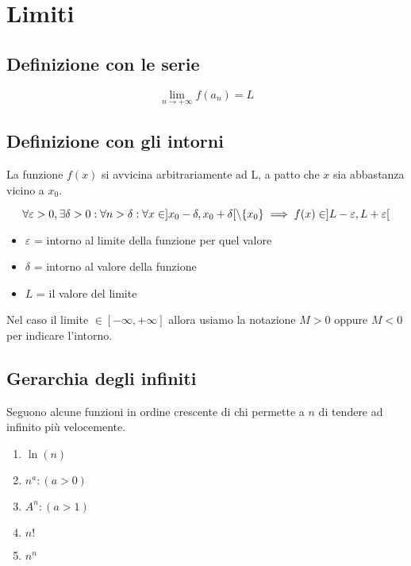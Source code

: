 \documentclass{subfiles}
\begin{document}
\section{Limiti}

\subsection{Definizione con le serie}

$$
\lim_{n \to +\infty} f(a_n) = L
$$

\subsection{Definizione con gli intorni}

La funzione $f(x)$ si avvicina arbitrariamente ad L, a patto che $x$ sia abbastanza vicino a $x_0$.

$$
\forall \varepsilon > 0, \exists \delta > 0 :
\forall n > \delta :
\forall x \in \space ] x_0 - \delta, x_0 + \delta [ \space \backslash \space \{x_0\}
\implies f(x) \in \space ] L - \varepsilon, L + \varepsilon [
$$

\begin{itemize}
    \item $\varepsilon$ = intorno al limite della funzione per quel valore
    \item $\delta$ = intorno al valore della funzione
    \item $L$ = il valore del limite
\end{itemize}

\noindent
Nel caso il limite $\in [-\infty, +\infty]$ allora usiamo la notazione $M > 0$ oppure $M < 0$ per indicare l'intorno.

\subsection{Gerarchia degli infiniti}

Seguono alcune funzioni in ordine crescente di chi permette a $n$ di tendere ad infinito più velocemente.

\begin{enumerate}
    \item $\ln(n)$
    \item $n^a : (a > 0)$
    \item $A^n : (a > 1)$
    \item $n!$
    \item $n^n$
\end{enumerate}
\end{document}
